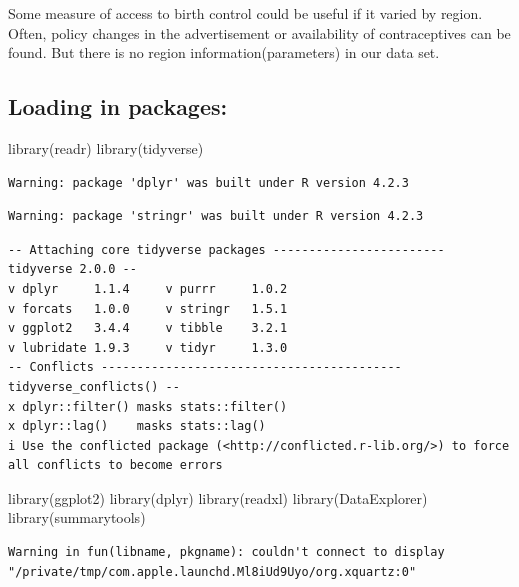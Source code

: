 \documentclass[
  letterpaper,
  DIV=11,
  numbers=noendperiod]{scrartcl}
\newenvironment{Shaded}{\begin{snugshade}}{\end{snugshade}}
\newcommand{\FunctionTok}[1]{\textcolor[rgb]{0.28,0.35,0.67}{#1}}
\newcommand{\NormalTok}[1]{\textcolor[rgb]{0.00,0.23,0.31}{#1}}
\begin{document}
Some measure of access to birth control could be useful if it varied by
region. Often, policy changes in the advertisement or availability of
contraceptives can be found. But there is no region
information(parameters) in our data set.

\hypertarget{loading-in-packages}{%
\subsection{Loading in packages:}\label{loading-in-packages}}

\begin{Shaded}
\begin{Highlighting}[]
\FunctionTok{library}\NormalTok{(readr)}
\FunctionTok{library}\NormalTok{(tidyverse)}
\end{Highlighting}
\end{Shaded}

\begin{verbatim}
Warning: package 'dplyr' was built under R version 4.2.3
\end{verbatim}

\begin{verbatim}
Warning: package 'stringr' was built under R version 4.2.3
\end{verbatim}

\begin{verbatim}
-- Attaching core tidyverse packages ------------------------ tidyverse 2.0.0 --
v dplyr     1.1.4     v purrr     1.0.2
v forcats   1.0.0     v stringr   1.5.1
v ggplot2   3.4.4     v tibble    3.2.1
v lubridate 1.9.3     v tidyr     1.3.0
-- Conflicts ------------------------------------------ tidyverse_conflicts() --
x dplyr::filter() masks stats::filter()
x dplyr::lag()    masks stats::lag()
i Use the conflicted package (<http://conflicted.r-lib.org/>) to force all conflicts to become errors
\end{verbatim}

\begin{Shaded}
\begin{Highlighting}[]
\FunctionTok{library}\NormalTok{(ggplot2)}
\FunctionTok{library}\NormalTok{(dplyr)}
\FunctionTok{library}\NormalTok{(readxl)}
\FunctionTok{library}\NormalTok{(DataExplorer)}
\FunctionTok{library}\NormalTok{(summarytools)}
\end{Highlighting}
\end{Shaded}

\begin{verbatim}
Warning in fun(libname, pkgname): couldn't connect to display
"/private/tmp/com.apple.launchd.Ml8iUd9Uyo/org.xquartz:0"
\end{verbatim}
\end{document}
